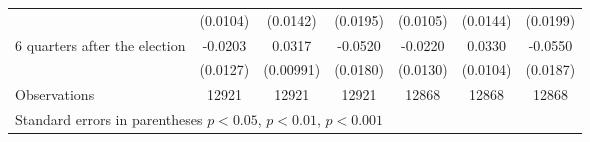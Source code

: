 \begin{table}[!ht]
\begin{tabular}{l*{6}{c}}
                    &    (0.0104)         &    (0.0142)         &    (0.0195)         &    (0.0105)         &    (0.0144)         &    (0.0199)         \\
[0,5em]
 6 quarters after the election&     -0.0203         &      0.0317\sym{**} &     -0.0520\sym{**} &     -0.0220         &      0.0330\sym{**} &     -0.0550\sym{**} \\
                    &    (0.0127)         &   (0.00991)         &    (0.0180)         &    (0.0130)         &    (0.0104)         &    (0.0187)         \\
\hline
Observations        &       12921         &       12921         &       12921         &       12868         &       12868         &       12868         \\
\hline\hline
\multicolumn{7}{l}{\footnotesize Standard errors in parentheses \sym{*} \(p<0.05\), \sym{**} \(p<0.01\), \sym{***} \(p<0.001\)}\\
\end{tabular}
\end{table}
